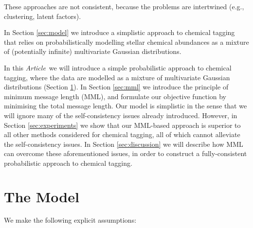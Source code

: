 \documentclass{aastex61}
\newcommand{\article}{\emph{Article}}
\begin{document}
These approaches are not consistent, because the problems are intertwined (e.g., clustering, latent factors).






In Section \ref{sec:model} we introduce a simplistic approach to chemical
tagging that relies on probabilistically modelling stellar chemical abundances
as a mixture of (potentially infinite) multivariate Gaussian distributions.



In this \article\ we will introduce a simple probabilistic approach to
chemical tagging, where the data are modelled as a mixture of multivariate
Gaussian distributions (Section \ref{sec:the-model}). In Section \ref{sec:mml}
we introduce the principle of minimum message length (MML), and formulate our
objective function by minimising the total message length. Our model is
simplistic in the sense that we will ignore many of the self-consistency
issues already introduced. However, in Section \ref{sec:experiments} we show
that our MML-based approach is superior to all other methods considered for
chemical tagging, all of which cannot alleviate the self-consistency issues.
In Section \ref{sec:discussion} we will describe how MML can overcome these
aforementioned issues, in order to construct a fully-consistent probabilistic
approach to chemical tagging.



\section{The Model}
\label{sec:the-model}

We make the following explicit assumptions:
\end{document}
